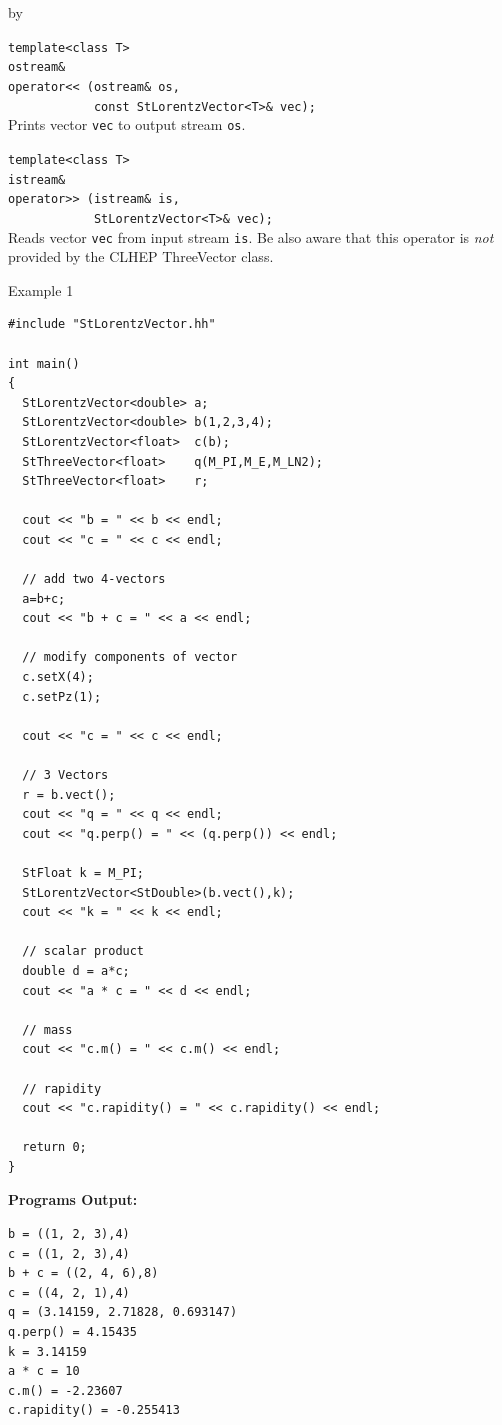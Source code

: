 \documentclass[twoside]{article}
\newcommand{\comp}[1]{\texttt{#1}}%
\newcommand{\entrylabel}[1]{\mbox{\textbf{{#1}}}\hfil}%
\newenvironment{entry}
{\begin{list}{}%
    {\renewcommand{\makelabel}{\entrylabel}%
     \setlength{\labelwidth}{90pt}%
     \setlength{\leftmargin}{\labelwidth}
     \advance\leftmargin by \labelsep%
      }%
    }%
  {\end{list}}
\newcommand{\Entrylabel}[1]%
{\raisebox{0pt}[1ex][0pt]{\makebox[\labelwidth][l]%
    {\parbox[t]{\labelwidth}{\hspace{0pt}\textbf{{#1}}}}}}
\newenvironment{Entry}%
{\renewcommand{\entrylabel}{\Entrylabel}\begin{entry}}%
  {\end{entry}}
\begin{document}
\begin{description}
\begin{Entry}
    \verb+template<class T>+\\
    \verb+ostream&+\\
    \verb+operator<< (ostream& os,+\\
    \verb+            const StLorentzVector<T>& vec);+\\
    Prints vector \comp{vec} to output stream \comp{os}.
    
    \verb+template<class T>+\\
    \verb+istream&+\\
    \verb+operator>> (istream& is,+\\
    \verb+            StLorentzVector<T>& vec);+\\
    Reads vector \comp{vec} from input stream \comp{is}.
    Be also aware that this operator is {\em not} provided by
    the CLHEP ThreeVector class.

\item[Example 1]
{\footnotesize
\begin{verbatim}
#include "StLorentzVector.hh"

int main()
{
  StLorentzVector<double> a;
  StLorentzVector<double> b(1,2,3,4);
  StLorentzVector<float>  c(b);
  StThreeVector<float>    q(M_PI,M_E,M_LN2);
  StThreeVector<float>    r;
  
  cout << "b = " << b << endl;
  cout << "c = " << c << endl;

  // add two 4-vectors
  a=b+c;
  cout << "b + c = " << a << endl;

  // modify components of vector
  c.setX(4);
  c.setPz(1);

  cout << "c = " << c << endl;

  // 3 Vectors
  r = b.vect();
  cout << "q = " << q << endl;
  cout << "q.perp() = " << (q.perp()) << endl;

  StFloat k = M_PI;
  StLorentzVector<StDouble>(b.vect(),k);
  cout << "k = " << k << endl;
  
  // scalar product
  double d = a*c;
  cout << "a * c = " << d << endl;

  // mass
  cout << "c.m() = " << c.m() << endl;

  // rapidity
  cout << "c.rapidity() = " << c.rapidity() << endl;
      
  return 0;
}
\end{verbatim}
}%
{\bf Programs Output:}
{\footnotesize
\begin{verbatim}
b = ((1, 2, 3),4)
c = ((1, 2, 3),4)
b + c = ((2, 4, 6),8)
c = ((4, 2, 1),4)
q = (3.14159, 2.71828, 0.693147)
q.perp() = 4.15435
k = 3.14159
a * c = 10
c.m() = -2.23607
c.rapidity() = -0.255413


\end{verbatim}}
\end{Entry}
\end{description}
\end{document}
